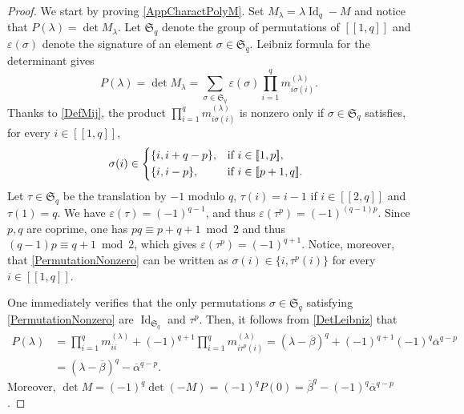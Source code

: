 \documentclass[JEP,XML,SOM,Unicode]{cedram}
\let\epsilon\varepsilon
\newcommand{\llbracket}{[\![}
\newcommand{\rrbracket}{]\!]}
\theoremstyle{plain}
\theoremstyle{definition}
\DeclareMathOperator{\id}{Id}
\begin{document}
\begin{proof}
We start by proving \eqref{AppCharactPolyM}. Set $M_\lambda = \lambda \id_q - M$ and notice that $P(\lambda) = \det M_\lambda$. Let $\mathfrak S_q$ denote the group of permutations of $\llbracket 1, q\rrbracket$ and $\epsilon(\sigma)$ denote the signature of an element $\sigma \in \mathfrak S_q$. Leibniz formula for the determinant gives
\begin{equation}
\label{DetLeibniz}
P(\lambda) = \det M_\lambda = \sum_{\sigma \in \mathfrak S_q} \epsilon(\sigma) \prod_{i=1}^q m_{i \sigma(i)}^{(\lambda)}.
\end{equation}
Thanks to \eqref{DefMij}, the product $\prod_{i=1}^q m_{i \sigma(i)}^{(\lambda)}$ is nonzero only if $\sigma \in \mathfrak S_q$ satisfies, for every $i \in \llbracket 1, q\rrbracket$,
\begin{equation}
\label{PermutationNonzero}
\sigma(i) \in
\begin{dcases*}
\{i, i + q - p\}, & if $i \in \llbracket 1, p\rrbracket$, \\
\{i, i - p\}, & if $i \in \llbracket p+1, q\rrbracket$.
\end{dcases*}
\end{equation}
Let $\tau \in \mathfrak S_q$ be the translation by $-1$ modulo $q$, \ie $\tau(i) = i - 1$ if $i \in \llbracket 2, q\rrbracket$ and $\tau(1) = q$. We have $\epsilon(\tau) = (-1)^{q-1}$, and thus $\epsilon(\tau^p) = (-1)^{(q-1)p}$. Since $p, q$ are coprime, one has $pq \equiv p + q + 1 \bmod 2$ and thus $(q-1)p \equiv q+1 \bmod 2$, which gives $\epsilon(\tau^p) = (-1)^{q+1}$. Notice, moreover, that \eqref{PermutationNonzero} can be written as $\sigma(i) \in \{i, \tau^p(i)\}$ for every $i \in \llbracket 1, q\rrbracket$.

One immediately verifies that the only permutations $\sigma \in \mathfrak S_q$ satisfying \eqref{PermutationNonzero} are $\id_{\mathfrak S_q}$ and $\tau^p$. Then, it follows from \eqref{DetLeibniz} that
\begin{align*}
P(\lambda) &= \prod_{i=1}^q m_{ii}^{(\lambda)} + (-1)^{q+1} \prod_{i=1}^q m_{i \tau^p(i)}^{(\lambda)} = \left(\lambda - \overline\beta\right)^q + (-1)^{q+1} (-1)^q \overline\alpha^{q - p}\\
& = \left(\lambda - \overline\beta\right)^q - \overline\alpha^{q - p}.
\end{align*}
Moreover, $\det M = (-1)^q \det(-M) = (-1)^q P(0) = \overline\beta^q - (-1)^q \overline\alpha^{q - p}$.


\end{proof}
\end{document}
